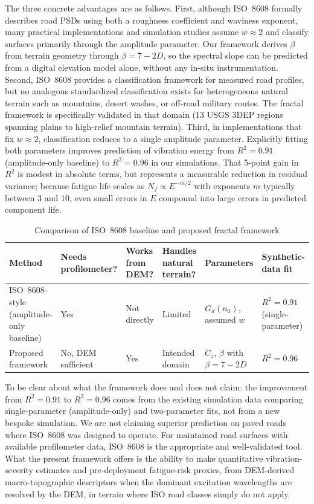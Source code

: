 \documentclass[11pt]{article}
\begin{document}
The three concrete advantages are as follows. First, although ISO~8608 formally describes road PSDs using both a roughness coefficient and waviness exponent, many practical implementations and simulation studies assume $w \approx 2$ and classify surfaces primarily through the amplitude parameter\cite{Mucka2018,Zuraulis2021}. Our framework derives $\beta$ from terrain geometry through $\beta = 7-2D$, so the spectral slope can be predicted from a digital elevation model alone, without any in-situ instrumentation. Second, ISO~8608 provides a classification framework for measured road profiles\cite{ISO8608}, but no analogous standardized classification exists for heterogeneous natural terrain such as mountains, desert washes, or off-road military routes. The fractal framework is specifically validated in that domain (13 USGS 3DEP regions spanning plains to high-relief mountain terrain). Third, in implementations that fix $w \approx 2$, classification reduces to a single amplitude parameter. Explicitly fitting both parameters improves prediction of vibration energy from $R^2 = 0.91$ (amplitude-only baseline) to $R^2 = 0.96$ in our simulations. That 5-point gain in $R^2$ is modest in absolute terms, but represents a measurable reduction in residual variance; because fatigue life scales as $N_f \propto E^{-m/2}$ with exponents $m$ typically between 3 and 10, even small errors in $E$ compound into large errors in predicted component life.

\begin{table}[h]
\centering
\caption{Comparison of ISO~8608 baseline and proposed fractal framework}
\label{tab:iso_comparison}
\small
\begin{tabular}{p{3.2cm}p{2.2cm}p{2.2cm}p{2.4cm}p{2.2cm}p{2.0cm}}
\hline
\textbf{Method} & \textbf{Needs profilometer?} & \textbf{Works from DEM?} & \textbf{Handles natural terrain?} & \textbf{Parameters} & \textbf{Synthetic-data fit} \\
\hline
ISO~8608-style (amplitude-only baseline) & Yes & Not directly & Limited & $G_d(n_0)$, assumed $w$ & $R^2 = 0.91$ (single-parameter) \\
\hline
Proposed framework & No, DEM sufficient & Yes & Intended domain & $C_z$, $\beta$ with $\beta = 7{-}2D$ & $R^2 = 0.96$ \\
\hline
\end{tabular}
\end{table}

To be clear about what the framework does and does not claim: the improvement from $R^2 = 0.91$ to $R^2 = 0.96$ comes from the existing simulation data comparing single-parameter (amplitude-only) and two-parameter fits, not from a new bespoke simulation. We are not claiming superior prediction on paved roads where ISO~8608 was designed to operate. For maintained road surfaces with available profilometer data, ISO~8608 is the appropriate and well-validated tool. What the present framework offers is the ability to make quantitative vibration-severity estimates and pre-deployment fatigue-risk proxies, from DEM-derived macro-topographic descriptors when the dominant excitation wavelengths are resolved by the DEM, in terrain where ISO road classes simply do not apply.
\end{document}
